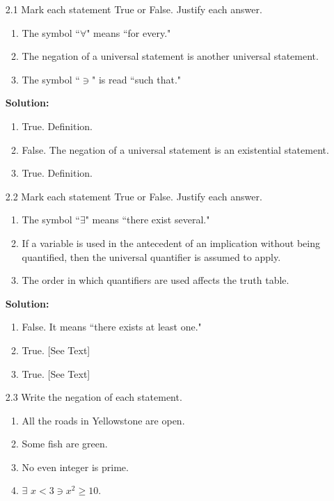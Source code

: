 \begin{enumerate}
   \item[2.1] Mark each statement True or False. Justify each answer.
      \begin{enumerate}
         \item The symbol ``$\forall$" means ``for every."
         \item The negation of a universal statement is another universal
               statement.
         \item The symbol ``$\ni$" is read ``such that."
      \end{enumerate}

      \textbf{Solution:} 

      \begin{enumerate}
         \item True. Definition.
         \item False. The negation of a universal statement is an existential
               statement.
         \item True. Definition.
      \end{enumerate}
   \item[2.2] Mark each statement True or False. Justify each answer.
      \begin{enumerate}
         \item The symbol ``$\exists$" means ``there exist several."
         \item If a variable is used in the antecedent of an implication without
               being quantified, then the universal quantifier is assumed to
               apply.
         \item The order in which quantifiers are used affects the truth table.
      \end{enumerate}

      \textbf{Solution:} 

      \begin{enumerate}
         \item False. It means ``there exists at least one."
         \item True. [See Text]
         \item True. [See Text]
      \end{enumerate}
   \item[2.3] Write the negation of each statement.
      \begin{enumerate}
         \item All the roads in Yellowstone are open.
         \item Some fish are green.
         \item No even integer is prime.
         \item $\exists$ $x < 3 \ni x^2 \ge 10.$
      \end{enumerate}


\end{enumerate}
